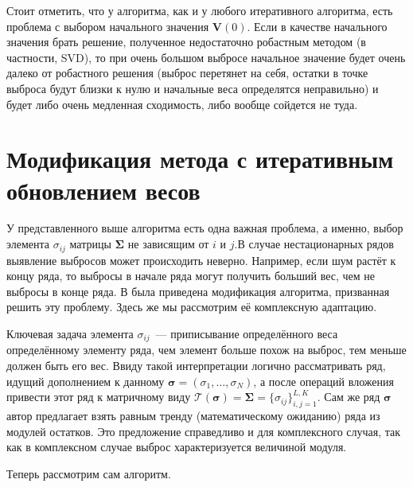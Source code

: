 \documentclass[specialist,
               substylefile = spbu.rtx,
               subf,href,colorlinks=true, 12pt]{disser}
\begin{document}
Стоит отметить, что у алгоритма, как и у любого итеративного алгоритма, есть проблема с выбором начального значения $\mathbf{V}(0)$. Если в качестве начального значения брать решение, полученное недостаточно робастным методом (в частности, SVD), то при очень большом выбросе начальное значение будет очень далеко от робастного решения (выброс перетянет на себя, остатки в точке выброса будут близки к нулю и начальные веса определятся неправильно) и будет либо очень медленная сходимость, либо вообще сойдется не туда.


\section{Модификация метода с итеративным обновлением весов}

У представленного выше алгоритма есть одна важная проблема, а именно, выбор элемента $\sigma_{ij}$ матрицы $\mathbf{\Sigma}$ не зависящим от $i$ и $j$.В случае нестационарных рядов выявление выбросов может происходить неверно. Например, если шум растёт к концу ряда, то выбросы в начале ряда могут получить больший вес, чем не выбросы в конце ряда. В \cite{Tretyakova20} была приведена модификация алгоритма, призванная решить эту проблему. Здесь же мы рассмотрим её комплексную адаптацию.

Ключевая задача элемента $\sigma_{ij}$~--- приписывание определённого веса определённому элементу ряда, чем элемент больше похож на выброс, тем меньше должен быть его вес. Ввиду такой интерпретации логично рассматривать ряд, идущий дополнением к данному $\bm{\sigma} = (\sigma_1,\ldots,\sigma_N)$, а после операций вложения привести этот ряд к матричному виду $\mathcal{T} (\bm{\sigma}) = \mathbf{\Sigma}=\{\sigma_{ij}\}_{i,j=1}^{L,K}$. Сам же ряд $\bm{\sigma}$ автор \cite{Tretyakova20} предлагает взять равным тренду (математическому ожиданию) ряда из модулей остатков. Это предложение справедливо и для комплексного случая, так как в комплексном случае выброс характеризуется величиной модуля.

Теперь рассмотрим сам алгоритм.
\end{document}

